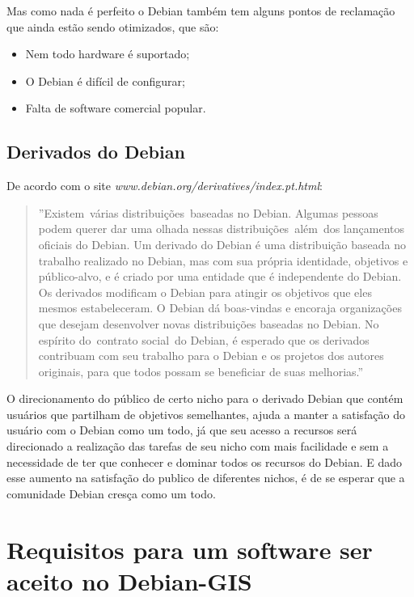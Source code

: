 Mas como nada é perfeito o Debian também tem alguns pontos de reclamação que ainda estão sendo otimizados, que são:

\begin{itemize}
	\item Nem todo hardware é suportado;
	\item O Debian é difícil de configurar;
	\item Falta de software comercial popular.

\end{itemize}

\subsection{Derivados do Debian}

De acordo com o site \textit{www.debian.org/derivatives/index.pt.html}: 
\begin{quote}
	''Existem várias distribuições baseadas no Debian. Algumas pessoas podem querer dar uma olhada nessas distribuições além dos lançamentos oficiais do Debian. Um derivado do Debian é uma distribuição baseada no trabalho realizado no Debian, mas com sua própria identidade, objetivos e público-alvo, e é criado por uma entidade que é independente do Debian. Os derivados modificam o Debian para atingir os objetivos que eles mesmos estabeleceram. O Debian dá boas-vindas e encoraja organizações que desejam desenvolver novas distribuições baseadas no Debian. No espírito do contrato social do Debian, é esperado que os derivados contribuam com seu trabalho para o Debian e os projetos dos autores originais, para que todos possam se beneficiar de suas melhorias.''
\end{quote}

O direcionamento do público de certo nicho para o derivado Debian que contém usuários que partilham de objetivos semelhantes, ajuda a manter a satisfação do usuário com o Debian como um todo, já que seu acesso a recursos será direcionado a realização das tarefas de seu nicho com mais facilidade e sem a necessidade de ter que conhecer e dominar todos os recursos do Debian. E dado esse aumento na satisfação do publico de diferentes nichos, é de se esperar que a comunidade Debian cresça como um todo.



\section{Requisitos para um software ser aceito no Debian-GIS}

